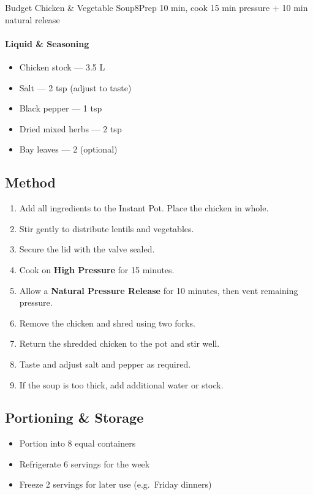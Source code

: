 \begin{recipebox}{Budget Chicken \& Vegetable Soup}{8}{Prep 10 min, cook 15 min pressure + 10 min natural release}
\paragraph{Liquid \& Seasoning}
\begin{itemize}
    \item Chicken stock — 3.5 L
    \item Salt — 2 tsp (adjust to taste)
    \item Black pepper — 1 tsp
    \item Dried mixed herbs — 2 tsp
    \item Bay leaves — 2 (optional)
\end{itemize}

\subsection*{Method}
\begin{enumerate}
    \item Add all ingredients to the Instant Pot. Place the chicken in whole.
    \item Stir gently to distribute lentils and vegetables.
    \item Secure the lid with the valve sealed.
    \item Cook on \textbf{High Pressure} for 15 minutes.
    \item Allow a \textbf{Natural Pressure Release} for 10 minutes, then vent remaining pressure.
    \item Remove the chicken and shred using two forks.
    \item Return the shredded chicken to the pot and stir well.
    \item Taste and adjust salt and pepper as required.
    \item If the soup is too thick, add additional water or stock.
\end{enumerate}

\subsection*{Portioning \& Storage}
\begin{itemize}
    \item Portion into 8 equal containers
    \item Refrigerate 6 servings for the week
    \item Freeze 2 servings for later use (e.g.\ Friday dinners)
\end{itemize}


\end{recipebox}
